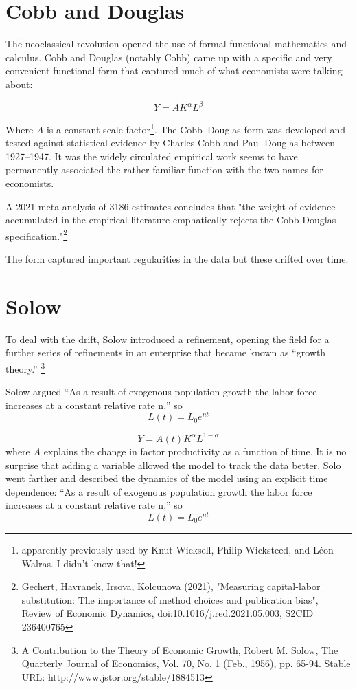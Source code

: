  \section{Cobb and Douglas}
 The neoclassical revolution opened the use of formal functional mathematics and calculus. Cobb and Douglas (notably Cobb) came up with a specific and very convenient functional form that captured much of what economists were talking about:
 
 \[Y=AK^\alpha L^\beta\]
 
 Where $A$ is a constant scale factor\footnote {apparently previously used by Knut Wicksell, Philip Wicksteed, and L\'eon Walras. I didn't know that!}. The Cobb–Douglas form was developed and tested against statistical evidence by Charles Cobb and Paul Douglas between 1927–1947. It was  the widely circulated empirical work seems to have permanently associated the rather familiar function with the two names for economists.
 
 A 2021 meta-analysis of 3186 estimates concludes that "the weight of evidence accumulated in the empirical literature emphatically rejects the Cobb-Douglas specification."\footnote{Gechert, Havranek, Irsova, Kolcunova (2021), "Measuring capital-labor substitution: The importance of method choices and publication bias", Review of Economic Dynamics, doi:10.1016/j.red.2021.05.003, S2CID 236400765}
 
 The form captured  important regularities in the data but these drifted over time. 
 
 \section{Solow}
To deal with the drift, Solow introduced a refinement, opening the field for a further series of refinements  in an enterprise that became known as ``growth theory.'' \footnote{A Contribution to the Theory of Economic Growth,  Robert M. Solow, The Quarterly Journal of Economics, Vol. 70, No. 1 (Feb., 1956), pp. 65-94. Stable URL: http://www.jstor.org/stable/1884513}

Solow argued ``As a result of exogenous population growth the labor force increases at a constant relative rate n,'' so
  \[L(t)= L_0e^{nt}\]


 \[Y=A(t)K^\alpha L^{1-\alpha}\]
 where $A$  explains the change in factor productivity as a function of time. It is no surprise that adding a variable allowed the model to track the data better. Solo went farther and described the dynamics of the model using an explicit time dependence: ``As a result of exogenous population growth the labor force increases at a constant relative rate n,'' so
  \[L(t)= L_0e^{nt}\]
  
